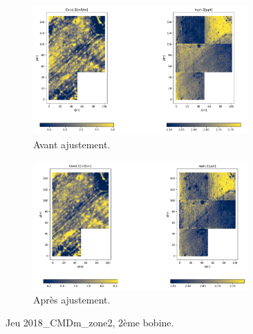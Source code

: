 \documentclass[12pt]{article}
\begin{document}
    \begin{figure}[ht!]
        \centering
        \begin{subfigure}[b]{\textwidth}
            \centering
            \includegraphics[width=0.9\textwidth]{Images/Frontiere_ex2_2.png}
            \caption[]%
            {{ \small Avant ajustement.}}    
        \end{subfigure}
        \centering
        \begin{subfigure}[b]{\textwidth}  
            \centering 
            \includegraphics[width=0.9\textwidth]{Images/Frontiere_ex2_2_aj.png}
            \caption[]%
            {{\small Après ajustement.}}    
        \end{subfigure}
        \caption{Jeu 2018\_CMDm\_zone2, 2ème bobine.}
    \end{figure}
\newpage
\end{document}
